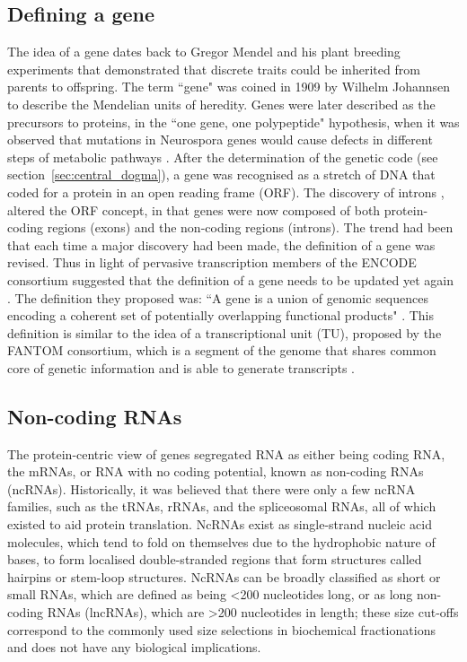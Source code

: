 \subsection{Defining a gene}

The idea of a gene dates back to Gregor Mendel and his plant breeding experiments that demonstrated that discrete traits could be inherited from parents to offspring. The term ``gene" was coined in 1909 by Wilhelm Johannsen to describe the Mendelian units of heredity. Genes were later described as the precursors to proteins, in the ``one gene, one polypeptide" hypothesis, when it was observed that mutations in Neurospora genes would cause defects in different steps of metabolic pathways  \citep{Beadle15111941}. After the determination of the genetic code (see section~\ref{sec:central_dogma}), a gene was recognised as a stretch of DNA that coded for a protein in an open reading frame (ORF). The discovery of introns \citep{pmid890740,pmid922889}, altered the ORF concept, in that genes were now composed of both protein-coding regions (exons) and the non-coding regions (introns). The trend had been that each time a major discovery had been made, the definition of a gene was revised. Thus in light of pervasive transcription members of the ENCODE consortium suggested that the definition of a gene needs to be updated yet again \citep{pmid17567988}. The definition they proposed was: ``A gene is a union of genomic sequences encoding a coherent set of potentially overlapping functional products" \citep{pmid17567988}. This definition is similar to the idea of a transcriptional unit (TU), proposed by the FANTOM consortium, which is a segment of the genome that shares common core of genetic information and is able to generate transcripts \citep{pmid12466851}.

\subsection{Non-coding RNAs}

The protein-centric view of genes segregated RNA as either being coding RNA, the mRNAs,  or RNA with no coding potential, known as non-coding RNAs (ncRNAs). Historically, it was believed that there were only a few ncRNA families, such as the tRNAs, rRNAs, and the spliceosomal RNAs, all of which existed to aid protein translation. NcRNAs exist as single-strand nucleic acid molecules, which tend to fold on themselves due to the hydrophobic nature of bases, to form localised double-stranded regions that form structures called hairpins or stem-loop structures. NcRNAs can be broadly classified as short or small RNAs, which are defined as being \textless200 nucleotides long, or as long non-coding RNAs (lncRNAs), which are \textgreater200 nucleotides in length; these size cut-offs correspond to the commonly used size selections in biochemical fractionations and does not have any biological implications.

